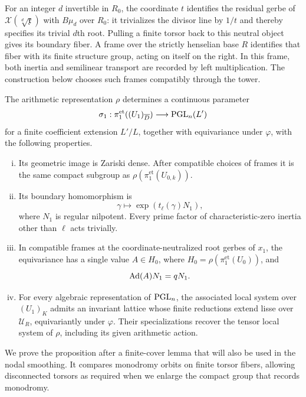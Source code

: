 For an integer $d$ invertible in $R_0$, the coordinate $t$ identifies
the residual gerbe of $\mathscr X(\sqrt[d]{\mathfrak x})$ with
$B\mu_d$ over $R_0$: it trivializes the divisor line by $1/t$ and
thereby specifies its trivial $d$th root.  Pulling a finite torsor
back to this neutral object gives its boundary fiber.  A frame over
the strictly henselian base $R$ identifies that fiber with its finite
structure group, acting on itself on the right.  In this frame, both inertia
and semilinear transport are recorded by left multiplication.  The
construction below chooses such frames compatibly through the tower.

\begin{proposition}\label{prop:lifted-parameter}
The arithmetic representation $\rho$ determines a continuous
parameter
\[
 \sigma_1:\pi_1^{\mathrm{et}}((U_1)_{\overline D})
             \longrightarrow\mathrm{PGL}_n(L')
\]
for a finite coefficient extension $L'/L$, together with equivariance
under $\varphi$, with the following properties.
\begin{enumerate}[(i)]
\item Its geometric image is Zariski dense.  After compatible choices
of frames it is the same compact subgroup as
$\rho(\pi_1^{\mathrm{et}}(U_{0,k}))$.
\item Its boundary homomorphism is
\begin{equation}\label{eq:lifted-boundary}
 \gamma\longmapsto\exp(t_\ell(\gamma)N_1),
\end{equation}
where $N_1$ is regular nilpotent.  Every prime factor of
characteristic-zero inertia other than $\ell$ acts trivially.
\item In compatible frames at the coordinate-neutralized root gerbes
of $x_1$, the equivariance has a single value
$A\in H_0$, where $H_0=\rho(\pi_1^{\mathrm{et}}(U_0))$, and
\begin{equation}\label{eq:frobenius-scales-nilpotent}
                    \operatorname{Ad}(A)N_1=qN_1.
\end{equation}
\item For every algebraic representation of $\mathrm{PGL}_n$, the associated
local system over $(U_1)_K$ admits an invariant lattice whose finite
reductions extend lisse over $\mathscr U_R$, equivariantly under
$\varphi$.  Their specializations recover the tensor local system of
$\rho$, including its given arithmetic action.
\end{enumerate}
\end{proposition}

We prove the proposition after a finite-cover lemma that will also be
used in the nodal smoothing.  It compares monodromy orbits on finite
torsor fibers, allowing disconnected torsors as required when we
enlarge the compact group that records monodromy.

